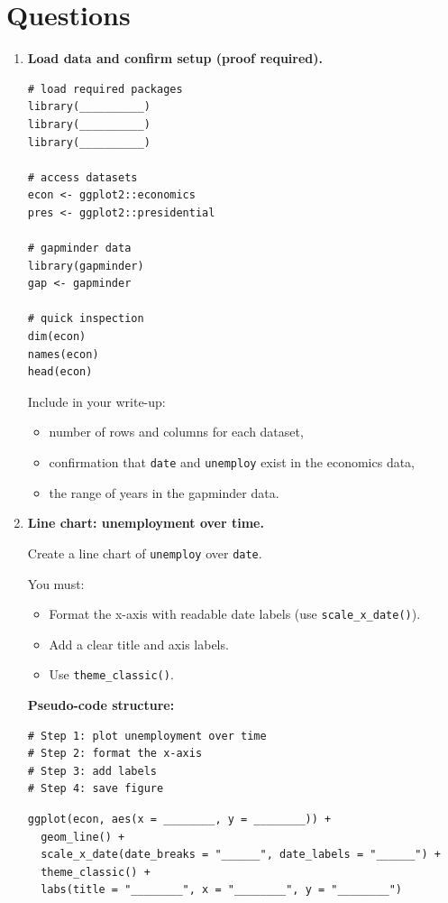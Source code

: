 \documentclass[11pt]{article}
\begin{document}
\section*{Questions}

\begin{enumerate}

\item \textbf{Load data and confirm setup (proof required).}

\begin{verbatim}
# load required packages
library(__________)
library(__________)
library(__________)

# access datasets
econ <- ggplot2::economics
pres <- ggplot2::presidential

# gapminder data
library(gapminder)
gap <- gapminder

# quick inspection
dim(econ)
names(econ)
head(econ)
\end{verbatim}

Include in your write-up:
\begin{itemize}
  \item number of rows and columns for each dataset,
  \item confirmation that \texttt{date} and \texttt{unemploy} exist in the economics data,
  \item the range of years in the gapminder data.
\end{itemize}

\item \textbf{Line chart: unemployment over time.}

Create a line chart of \texttt{unemploy} over \texttt{date}.

You must:
\begin{itemize}
  \item Format the x-axis with readable date labels (use \texttt{scale\_x\_date()}).
  \item Add a clear title and axis labels.
  \item Use \texttt{theme\_classic()}.
\end{itemize}

\textbf{Pseudo-code structure:}

\begin{verbatim}
# Step 1: plot unemployment over time
# Step 2: format the x-axis
# Step 3: add labels
# Step 4: save figure
\end{verbatim}

\begin{verbatim}
ggplot(econ, aes(x = ________, y = ________)) +
  geom_line() +
  scale_x_date(date_breaks = "______", date_labels = "______") +
  theme_classic() +
  labs(title = "________", x = "________", y = "________")
\end{verbatim}


\end{enumerate}
\end{document}
